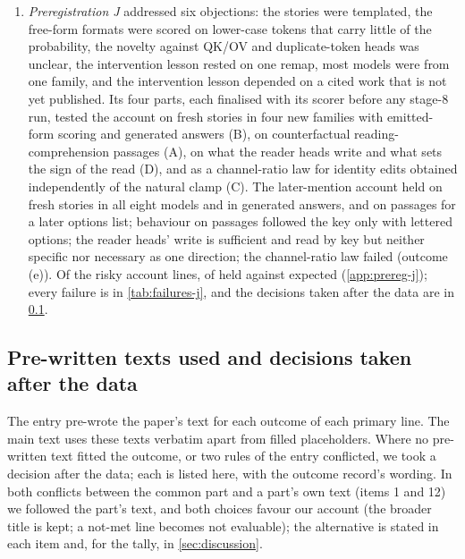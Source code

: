 \begin{enumerate}
  \item \emph{Preregistration J} addressed six objections: the stories were templated, the free-form formats were scored on lower-case tokens that carry little of the probability, the novelty against QK/OV and duplicate-token heads was unclear, the intervention lesson rested on one remap, most models were from one family, and the intervention lesson depended on a cited work that is not yet published. Its four parts, each finalised with its scorer before any stage-8 run, tested the account on fresh stories in four new families with emitted-form scoring and generated answers (B), on counterfactual reading-comprehension passages (A), on what the reader heads write and what sets the sign of the read (D), and as a channel-ratio law for identity edits obtained independently of the natural clamp (C). The later-mention account held on fresh stories in all eight models and in generated answers, and on passages for a later options list; behaviour on passages followed the key only with lettered options; the reader heads' write is sufficient and read by key but neither specific nor necessary as one direction; the channel-ratio law failed (outcome (e)). Of the risky account lines, \JxRiskyMetABCD{} of \JxRiskyVerdABCD{} held against \JxRiskyExpABCD{} expected (\cref{app:prereg-j}); every failure is in \cref{tab:failures-j}, and the decisions taken after the data are in \cref{app:decisions}.
\end{enumerate}

\subsection{Pre-written texts used and decisions taken after the data}\label{app:decisions}

The entry pre-wrote the paper's text for each outcome of each primary line. The main text uses these texts verbatim apart from filled placeholders. Where no pre-written text fitted the outcome, or two rules of the entry conflicted, we took a decision after the data; each is listed here, with the outcome record's wording. In both conflicts between the common part and a part's own text (items 1 and 12) we followed the part's text, and both choices favour our account (the broader title is kept; a not-met line becomes not evaluable); the alternative is stated in each item and, for the tally, in \cref{sec:discussion}.

